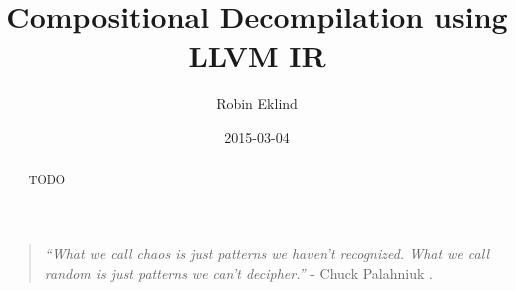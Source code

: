 \documentclass[12pt, a4paper]{article}
\title{Compositional Decompilation using LLVM IR}
\author{Robin Eklind}
\date{2015-03-04} %
\begin{document}
\maketitle

\begin{abstract}
TODO
\end{abstract}

\vfill

\begin{quote}
	\textit{``What we call chaos is just patterns we haven't recognized. What we call random is just patterns we can't decipher.''} - Chuck Palahniuk \cite{patterns_quote}.
\end{quote}

\pagebreak

%

\tableofcontents


















%
\end{document}
